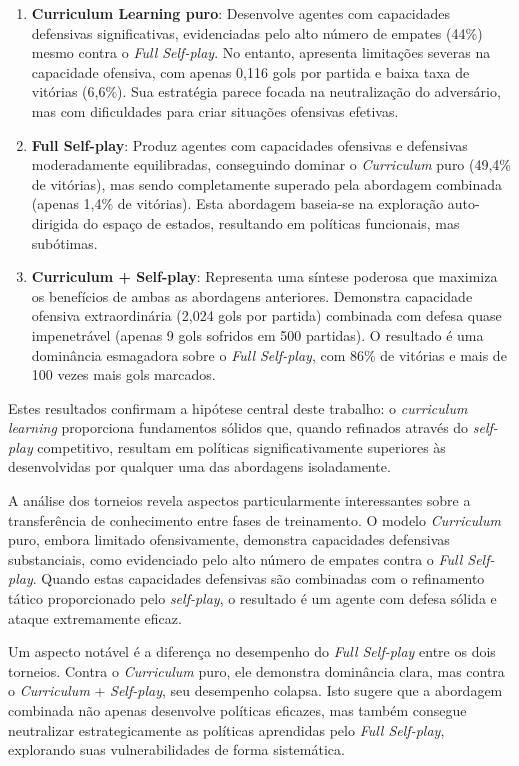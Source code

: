 \begin{enumerate}
    \item \textbf{Curriculum Learning puro}: Desenvolve agentes com capacidades defensivas significativas, evidenciadas pelo alto número de empates (44\%) mesmo contra o \textit{Full Self-play}. No entanto, apresenta limitações severas na capacidade ofensiva, com apenas 0,116 gols por partida e baixa taxa de vitórias (6,6\%). Sua estratégia parece focada na neutralização do adversário, mas com dificuldades para criar situações ofensivas efetivas.
    
    \item \textbf{Full Self-play}: Produz agentes com capacidades ofensivas e defensivas moderadamente equilibradas, conseguindo dominar o \textit{Curriculum} puro (49,4\% de vitórias), mas sendo completamente superado pela abordagem combinada (apenas 1,4\% de vitórias). Esta abordagem baseia-se na exploração auto-dirigida do espaço de estados, resultando em políticas funcionais, mas subótimas.
    
    \item \textbf{Curriculum + Self-play}: Representa uma síntese poderosa que maximiza os benefícios de ambas as abordagens anteriores. Demonstra capacidade ofensiva extraordinária (2,024 gols por partida) combinada com defesa quase impenetrável (apenas 9 gols sofridos em 500 partidas). O resultado é uma dominância esmagadora sobre o \textit{Full Self-play}, com 86\% de vitórias e mais de 100 vezes mais gols marcados.
\end{enumerate}

Estes resultados confirmam a hipótese central deste trabalho: o \textit{curriculum learning} proporciona fundamentos sólidos que, quando refinados através do \textit{self-play} competitivo, resultam em políticas significativamente superiores às desenvolvidas por qualquer uma das abordagens isoladamente.

A análise dos torneios revela aspectos particularmente interessantes sobre a transferência de conhecimento entre fases de treinamento. O modelo \textit{Curriculum} puro, embora limitado ofensivamente, demonstra capacidades defensivas substanciais, como evidenciado pelo alto número de empates contra o \textit{Full Self-play}. Quando estas capacidades defensivas são combinadas com o refinamento tático proporcionado pelo \textit{self-play}, o resultado é um agente com defesa sólida e ataque extremamente eficaz.

Um aspecto notável é a diferença no desempenho do \textit{Full Self-play} entre os dois torneios. Contra o \textit{Curriculum} puro, ele demonstra dominância clara, mas contra o \textit{Curriculum} + \textit{Self-play}, seu desempenho colapsa. Isto sugere que a abordagem combinada não apenas desenvolve políticas eficazes, mas também consegue neutralizar estrategicamente as políticas aprendidas pelo \textit{Full Self-play}, explorando suas vulnerabilidades de forma sistemática.


